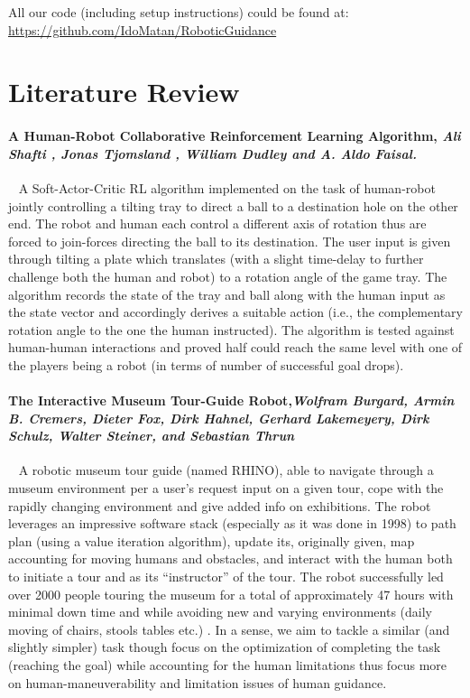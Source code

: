 \documentclass[a4paper,11pt]{article}
\begin{document}
All our code (including setup instructions) could be found at: \\ 
\hyperlink{https://github.com/IdoMatan/RoboticGuidance}{https://github.com/IdoMatan/RoboticGuidance}


\section{Literature Review}

\paragraph{A Human-Robot Collaborative Reinforcement Learning Algorithm, \textit{Ali Shafti , Jonas Tjomsland , William Dudley and A. Aldo Faisal.}}  ~\cite{kartoun2010human}
A Soft-Actor-Critic RL algorithm implemented on the task of human-robot jointly controlling a tilting tray to direct a ball to a destination hole on the other end. The robot and human each control a different axis of rotation thus are forced to join-forces directing the ball to its destination. The user input is given through tilting a plate which translates (with a slight time-delay to further challenge both the human and robot) to a rotation angle of the game tray. The algorithm records the state of the tray and ball along with the human input as the state vector and accordingly derives a suitable action (i.e., the complementary rotation angle to the one the human instructed). The algorithm is tested against human-human interactions and proved half could reach the same level with one of the players being a robot (in terms of number of successful goal drops).

\newpage
\paragraph{The Interactive Museum Tour-Guide Robot,\textit{Wolfram Burgard, Armin B. Cremers, Dieter Fox, Dirk Hahnel, Gerhard Lakemeyery, Dirk Schulz, Walter Steiner, and Sebastian Thrun}} ~\cite{burgard1998interactive}
A robotic museum tour guide (named RHINO), able to navigate through a museum environment per a user’s request input on a given tour, cope with the rapidly changing environment and give added info on exhibitions. The robot leverages an impressive software stack (especially as it was done in 1998) to path plan (using a value iteration algorithm), update its, originally given, map accounting for moving humans and obstacles, and interact with the human both to initiate a tour and as its “instructor” of the tour. The robot successfully led over 2000 people touring the museum for a total of approximately 47 hours with minimal down time and while avoiding new and varying environments (daily moving of chairs, stools tables etc.) . In a sense, we aim to tackle a similar (and slightly simpler) task though focus on the optimization of completing the task (reaching the goal) while accounting for the human limitations thus focus more on human-maneuverability and limitation issues of human guidance.
\end{document}
